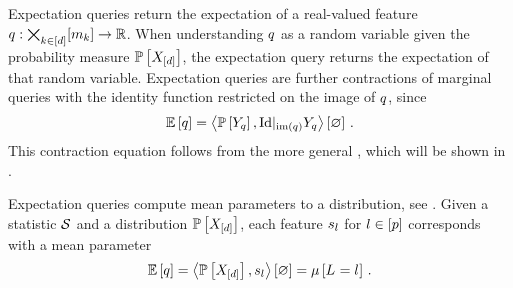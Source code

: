 Expectation queries return the expectation of a real-valued feature $q : \bigtimes_{k\in[d]}[m_{k}]\rightarrow\mathbb{R}$.
When understanding $q$ as a random variable given the probability measure $\mathbb{P}\left[X_{[d]}\right]$, the expectation query returns the expectation of that random variable.
Expectation queries are further contractions of marginal queries with the identity function restricted on the image of $q$, since
\begin{align*}
    \mathbb{E}\left[q\right]
    = \left\langle \mathbb{P}\left[Y_{q}\right],{\mathrm{Id}}|_{\mathrm{im}\left(q\right)}{Y_{q}} \right\rangle \left[ \varnothing \right] \, .
\end{align*}
This contraction equation follows from the more general , which will be shown in .

Expectation queries compute mean parameters to a distribution, see .
Given a statistic $\mathcal{S}$ and a distribution $\mathbb{P}\left[X_{[d]}\right]$, each feature $s_{l}$ for $l\in[p]$ corresponds with a mean parameter
\begin{align*}
    \mathbb{E}\left[q\right] = \left\langle \mathbb{P}\left[X_{[d]}\right],s_{l}\right\rangle \left[ \varnothing \right] = \mu\left[L_{}=l_{}\right] \, .
\end{align*}



